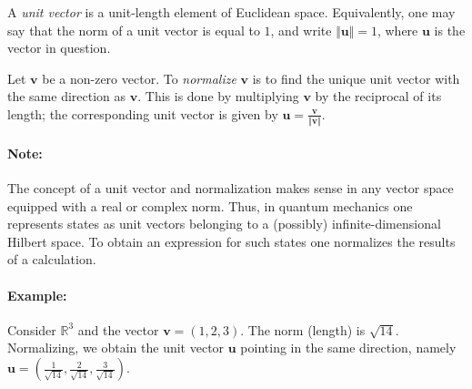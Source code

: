 \documentclass[12pt]{article}
\newcommand{\bu}{\mathbf{u}}
\newcommand{\bv}{\mathbf{v}}
\begin{document}
A \emph{unit vector} is a unit-length element of Euclidean space.
Equivalently, one may say that the norm of a unit vector is equal
to $1$, and write $\Vert \bu\Vert=1$, where $\bu$ is the vector in
question.

Let $\bv$ be a non-zero vector.  To \emph{normalize} $\bv$ is to find
the unique unit vector with the same direction as $\bv$. This is done
by multiplying $\bv$ by the reciprocal of its length; the
corresponding unit vector is given by $\bu=\frac{\bv}{\Vert
  \bv\Vert}$.

\paragraph{Note:} The concept of a unit vector and normalization makes
sense in any vector space equipped with a real or complex norm.
Thus, in quantum mechanics one  represents states as unit vectors
belonging to a (possibly) infinite-dimensional Hilbert space.  To
obtain an expression for such states one  normalizes
the results of a calculation. 

\paragraph{Example:} Consider $\mathbb{R}^3$ and the vector
$\bv=(1,2,3)$. The norm (length) is $\sqrt{14}$.  Normalizing, we obtain
the unit vector $\bu$ pointing in the same direction, namely
$\bu=\left(\frac{1}{\sqrt{14}},\frac{2}{\sqrt{14}},\frac{3}{\sqrt{14}}\right)$.
\end{document}
